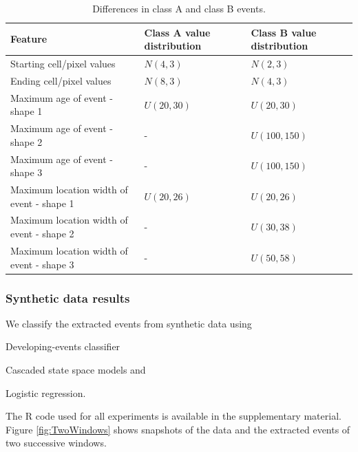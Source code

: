 \documentclass[11pt]{article}
\begin{document}
	
	\begin{table}[!ht]
		\centering
		\caption{Differences in class A and class B events. }
		\footnotesize
		\begin{tabular}{p{6cm}p{3.5cm}p{3.5cm}}
			\toprule
			Feature &  Class A value distribution & Class B value distribution \\
			\midrule
			Starting cell/pixel values     & $N(4,3)$			& $N(2, 3)$           \\
			Ending cell/pixel values       & $N(8,3)$          	& $N(4, 3)$           \\
			Maximum age of event - shape 1  & $U(20,30)$ 	    & $U(20,30)$     \\
			Maximum age of event - shape 2  & - 	 	    		& $U(100,150)$  	\\
			Maximum age of event - shape 3  & - 	 	    		& $U(100,150)$     	\\
			Maximum location width of event - shape 1  & $U(20,26)$    & $U(20,26)$       \\
			Maximum location width of event - shape 2 & -   		& $U(30,38)$  	\\
			Maximum location width of event - shape 3 & - 	 	& $U(50,58)$     	\\
			\bottomrule
		\end{tabular}
		\label{tab:DiffClassAandB}
	\end{table}
	

	 \subsubsection{Synthetic data results}
	We classify the extracted events from synthetic data using \begin{inparaenum} \item Developing-events classifier \item Cascaded state space models and \item Logistic regression.  \end{inparaenum} The R code used for all experiments is available in the supplementary material. Figure \ref{fig:TwoWindows} shows snapshots of the data and the extracted events of two successive windows.
	
\end{document}
